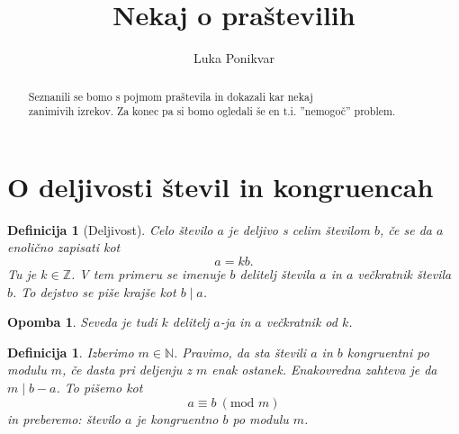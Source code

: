\documentclass{amsart}
\title[Praštevila]{Nekaj o praštevilih}
\author{Luka Ponikvar}
\newcommand{\NN}{\mathbb{N}}
\newcommand{\ZZ}{\mathbb{Z}}
\newtheorem{definicija}[izrek]{Definicija}
\newtheorem{opomba}[izrek]{Opomba}
\begin{document}
\maketitle


\begin{abstract}
    Seznanili se bomo s pojmom praštevila in dokazali kar nekaj\\ zanimivih izrekov. Za konec pa si bomo ogledali še en t.i. 
    ''nemogoč'' problem.
\end{abstract}


\section{O deljivosti števil in kongruencah}

\begin{definicija}[Deljivost]
    Celo število \(a\) je \emph{deljivo} s celim številom \(b\), če se da \(a\) enolično zapisati kot
    \[a = kb.\]
    Tu je \(k \in \ZZ\). V tem primeru se imenuje \(b\) \emph{delitelj} števila \(a\) in \(a\) \emph{večkratnik} števila \(b\).
    To dejstvo se piše krajše kot \(b \mid a\).
\end{definicija}

\begin{opomba}
    Seveda je tudi \(k\) delitelj \(a\)-ja in \(a\) večkratnik od \(k\).
\end{opomba}

\begin{definicija}
    Izberimo $m \in \NN$. Pravimo, da sta števili $a$ in $b$ \emph{kongruentni} po modulu $m$, če dasta pri deljenju z $m$ 
    enak ostanek. Enakovredna zahteva je da $m \mid b-a$. To pišemo kot $$a \equiv b\ (\text{mod } m)$$ in preberemo: 
    število $a$ je kongruentno $b$ po modulu $m$.
\end{definicija}
\end{document}
